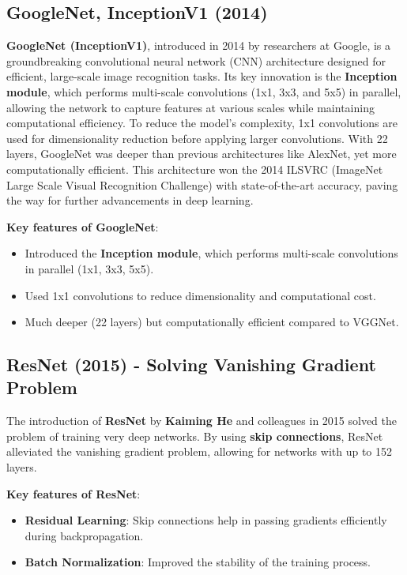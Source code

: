 \subsection{GoogleNet, InceptionV1 (2014)}
\textbf{GoogleNet (InceptionV1)}, introduced in 2014 by researchers at Google, is a groundbreaking convolutional neural network (CNN) architecture designed for efficient, large-scale image recognition tasks. Its key innovation is the \textbf{Inception module}, which performs multi-scale convolutions (1x1, 3x3, and 5x5) in parallel, allowing the network to capture features at various scales while maintaining computational efficiency. To reduce the model's complexity, 1x1 convolutions are used for dimensionality reduction before applying larger convolutions. With 22 layers, GoogleNet was deeper than previous architectures like AlexNet, yet more computationally efficient. This architecture won the 2014 ILSVRC (ImageNet Large Scale Visual Recognition Challenge) with state-of-the-art accuracy, paving the way for further advancements in deep learning.\cite{szegedy2015googlenet}

\textbf{Key features of GoogleNet}:
\begin{itemize}
    \item Introduced the \textbf{Inception module}, which performs multi-scale convolutions in parallel (1x1, 3x3, 5x5).
    \item Used 1x1 convolutions to reduce dimensionality and computational cost.
    \item Much deeper (22 layers) but computationally efficient compared to VGGNet.
\end{itemize}

\subsection{ResNet (2015) - Solving Vanishing Gradient Problem}
The introduction of \textbf{ResNet} by \textbf{Kaiming He} and colleagues in 2015 solved the problem of training very deep networks. By using \textbf{skip connections}, ResNet alleviated the vanishing gradient problem, allowing for networks with up to 152 layers.\cite{he2015deep}

\textbf{Key features of ResNet}:
\begin{itemize}
    \item \textbf{Residual Learning}: Skip connections help in passing gradients efficiently during backpropagation.
    \item \textbf{Batch Normalization}: Improved the stability of the training process.
\end{itemize}

